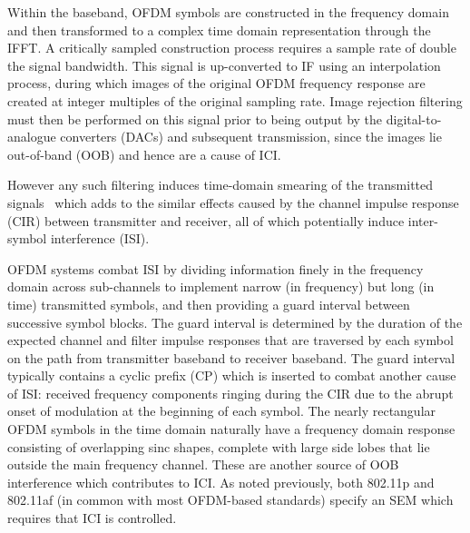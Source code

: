 Within the baseband, OFDM symbols are constructed in the frequency domain and then transformed to a complex time domain representation through the IFFT.
A critically sampled construction process requires a sample rate of double the signal bandwidth.
This signal is up-converted to IF using an interpolation process, during which images of the original OFDM frequency response are created at integer multiples of the original sampling rate.
Image rejection filtering must then be performed on this signal prior to being output by the digital-to-analogue converters (DACs) and subsequent transmission, since the images lie out-of-band (OOB) and hence are a cause of ICI.

However any such filtering induces time-domain smearing of the transmitted signals~\cite{Faulkner2000} which adds to the similar effects caused by the channel impulse response (CIR) between transmitter and receiver, all of which potentially induce inter-symbol interference (ISI).

OFDM systems combat ISI by dividing information finely in the frequency domain across sub-channels to implement narrow (in frequency) but long (in time) transmitted symbols, and then providing a guard interval between successive symbol blocks.
The guard interval is determined by the duration of the expected channel and filter impulse responses that are traversed by each symbol on the path from transmitter baseband to receiver baseband.
The guard interval typically contains a cyclic prefix (CP) which is inserted to combat another cause of ISI: received frequency components ringing during the CIR due to the abrupt onset of modulation at the beginning of each symbol.
%
The nearly rectangular OFDM symbols in the time domain naturally have a frequency domain response consisting of overlapping sinc shapes, complete with large side lobes that lie outside the main frequency channel.
These are another source of OOB interference which contributes to ICI.
As noted previously, both 802.11p and 802.11af (in common with most OFDM-based standards) specify an SEM which requires that ICI is controlled.

